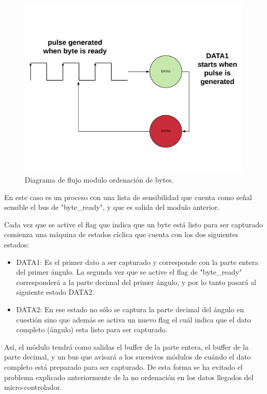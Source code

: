 \begin{figure}[H]
	\center
	\includegraphics[scale=0.5]{imagenes/Balancing_robot/arrange_angle.pdf}
	\caption{Diagrama de flujo modulo ordenación de bytes.}
	\label{fig:arrange_angle}
\end{figure}



En este caso es un proceso con una lista de sensibilidad que cuenta como señal sensible el bus de "byte\_ready", y que es salida del modulo anterior. \newline

Cada vez que se active el flag que indica que un byte está listo para ser capturado comienza una máquina de estados cíclica que cuenta con los dos siguientes estados:

\begin{itemize}
	 \item DATA1: Es el primer dato a ser capturado y corresponde con la parte entera del primer ángulo. La segunda vez que se active el flag de "byte\_ready" corresponderá a la parte decimal del primer ángulo, y por lo tanto pasará al siguiente estado DATA2.
	 \item DATA2: En ese estado no sólo se captura la parte decimal del ángulo en cuestión sino que además se activa un nuevo flag el cuál indica que el dato completo (ángulo) esta listo para ser capturado. 
\end{itemize}

Así, el módulo tendrá como salidas el buffer de la parte entera, el buffer de la parte decimal, y un bus que avisará a los sucesivos módulos de cuándo el dato completo está preparado para ser capturado. De esta forma se ha evitado el problema explicado anteriormente de la no ordenación en los datos llegados del micro-controlador.  \newline

